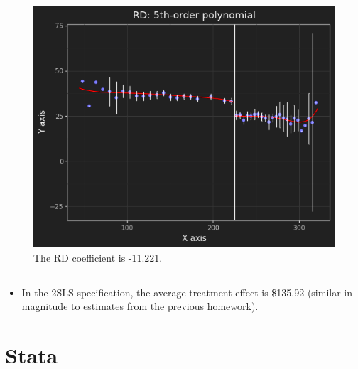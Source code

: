 \documentclass{article}
\begin{document}
\clearpage

\subsection{}
\begin{figure}[!h]
    \centering
    \includegraphics[scale=.9]{homework6/output/rdplot3.png}
    \caption{The RD coefficient is -11.221.}
    \label{fig:figure4}
\end{figure}

\subsection{}
\begin{itemize}
    \item In the 2SLS specification, the average treatment effect is \$135.92 (similar in magnitude to estimates from the previous homework).
\end{itemize}

\section{Stata}
\subsection{}
\end{document}
